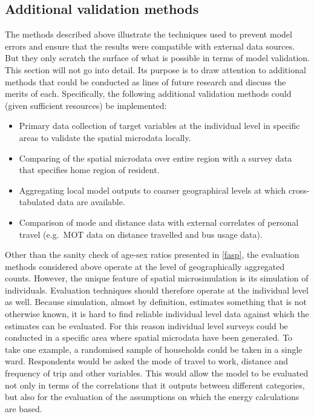 \documentclass[a4paper, 11pt, twoside]{article}
\begin{document}
\subsection{Additional validation methods}
The methods described above illustrate the techniques used to prevent
model errors and ensure that the results were compatible with external data
sources. But they only scratch the surface of what is possible in terms of
model validation. This section will not go into detail. Its
purpose is to draw attention to
additional methods that could be conducted as lines of future research
and discuss the merits of each. Specifically, the following additional validation
methods could (given sufficient resources) be implemented:
\begin{itemize}
 \item Primary data collection of target variables at the individual level
 in specific areas to  validate the spatial microdata locally.
 \item Comparing of the spatial microdata over entire region with a
 survey data that specifies home region of resident.
 \item Aggregating local model outputs to coarser geographical levels at which
 cross-tabulated data are available.
 \item Comparison of mode and distance data with external correlates of personal
 travel (e.g.~MOT data on distance travelled and bus usage data).
\end{itemize}

Other than the sanity check of age-sex ratios presented in \cref{fasp},
the evaluation methods considered above operate at the level of geographically
aggregated counts. However, the unique feature of spatial microsimulation is
its simulation of individuals. Evaluation techniques should therefore operate
at the individual level as well.
%
Because simulation, almost by definition, estimates something that is not
otherwise known, it is hard to find reliable individual level
data against which the estimates can be evaluated. For this reason
individual level surveys could be conducted in a specific area where
spatial microdata have been generated. To take one example, a randomised
sample of households could be taken in a single ward. Respondents would be
asked the mode of travel to work, distance and frequency of trip and
other variables. This would allow the model to be evaluated
not only in terms of the correlations that it outputs between different categories,
but also for the evaluation of the assumptions on which the energy calculations %
are based.
\end{document}
